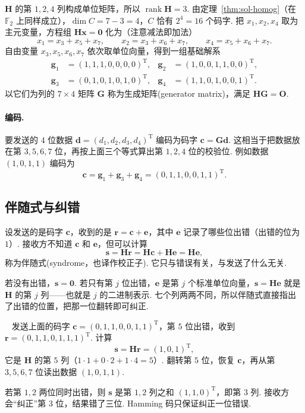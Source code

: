 \documentclass[lang=cn,10.5pt,scheme=chinese,toc=twocol,section,chinesefont=nofont,
twoside,citestyle=gb7714-2015,bibstyle=gb7714-2015]{elegantbook}
\DeclareRobustCommand{\textbf}[1]{{\lnsemiboldlatin\lnsemiboldcjk #1}}
\newcommand{\vv}[1]{\boldsymbol{#1}}
\newcommand{\zero}{\boldsymbol{0}}          %
\newcommand{\trans}{\mathrm{T}}             %
\numberwithin{equation}{section}   %
\newcommand{\rk}{\operatorname{rank}}       %
\newcommand*{\lnlabel}[1]{{\sffamily\bfseries\color{black}#1}}
\renewenvironment{example}[1][]{%
	\refstepcounter{exam}%
	\par\noindent\lnlabel{\examplename\ \theexam\ifblank{#1}{}{\ #1}}\ \rmfamily}{%
	\par\ignorespacesafterend}
\begin{document}
$\vv H$ 的第 $1,2,4$ 列构成单位矩阵，所以 $\rk\vv H=3$. 由定理~\ref{thm:sol-homog}（在 $\mathbb{F}_2$ 上同样成立），$\dim C=7-3=4$，$C$ 恰有 $2^4=16$ 个码字. 把 $x_1,x_2,x_4$ 取为主元变量，方程组 $\vv H\vv x=\zero$ 化为（注意减法即加法）
\[
  x_1=x_3+x_5+x_7,\qquad x_2=x_3+x_6+x_7,\qquad x_4=x_5+x_6+x_7.
\]
自由变量 $x_3,x_5,x_6,x_7$ 依次取单位向量，得到一组基础解系
\[
  \begin{aligned}
    \vv g_1 & =(1,1,1,0,0,0,0)^\trans, & \vv g_2 & =(1,0,0,1,1,0,0)^\trans, \\
    \vv g_3 & =(0,1,0,1,0,1,0)^\trans, & \vv g_4 & =(1,1,0,1,0,0,1)^\trans.
  \end{aligned}
\]
以它们为列的 $7\times4$ 矩阵 $\vv G$ 称为\textbf{生成矩阵}(generator matrix)，满足 $\vv H\vv G=\vv O$.

\paragraph*{编码.} 要发送的 $4$ 位数据 $\vv d=(d_1,d_2,d_3,d_4)^\trans$ 编码为码字 $\vv c=\vv G\vv d$. 这相当于把数据放在第 $3,5,6,7$ 位，再按上面三个等式算出第 $1,2,4$ 位的\textbf{校验位}. 例如数据 $(1,0,1,1)$ 编码为
\[
  \vv c=\vv g_1+\vv g_3+\vv g_4=(0,1,1,0,0,1,1)^\trans.
\]

\subsection{伴随式与纠错}

设发送的是码字 $\vv c$，收到的是 $\vv r=\vv c+\vv e$，其中 $\vv e$ 记录了哪些位出错（出错的位为 $1$）. 接收方不知道 $\vv c$ 和 $\vv e$，但可以计算
\[
  \vv s=\vv H\vv r=\vv H\vv c+\vv H\vv e=\vv H\vv e,
\]
称为\textbf{伴随式}(syndrome，也译作校正子). 它只与错误有关，与发送了什么无关.

若没有出错，$\vv s=\zero$. 若只有第 $j$ 位出错，$\vv e$ 是第 $j$ 个标准单位向量，$\vv s=\vv H\vv e$ 就是 $\vv H$ 的第 $j$ 列——也就是 $j$ 的二进制表示. 七个列两两不同，所以\textbf{伴随式直接指出了出错的位置}，把那一位翻转即可纠正.

\begin{example}
  发送上面的码字 $\vv c=(0,1,1,0,0,1,1)^\trans$，第 $5$ 位出错，收到 $\vv r=(0,1,1,0,1,1,1)^\trans$. 计算
  \[
    \vv s=\vv H\vv r=(1,0,1)^\trans,
  \]
  它是 $\vv H$ 的第 $5$ 列（$1\cdot1+0\cdot2+1\cdot4=5$）. 翻转第 $5$ 位，恢复 $\vv c$，再从第 $3,5,6,7$ 位读出数据 $(1,0,1,1)$.

  若第 $1,2$ 两位同时出错，则 $\vv s$ 是第 $1,2$ 列之和 $(1,1,0)^\trans$，即第 $3$ 列. 接收方会“纠正”第 $3$ 位，结果错了三位. Hamming 码只保证纠正一位错误.
\end{example}
\end{document}
